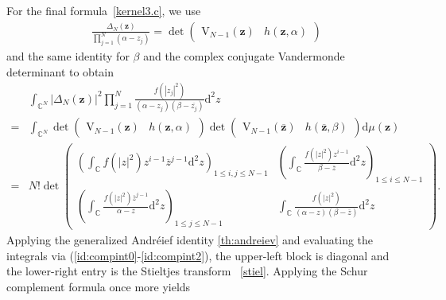 \documentclass[pdflatex,sn-mathphys-num]{sn-jnl}
\theoremstyle{thmstyleone}
\numberwithin{equation}{section}
\newcommand{\C}{\mathbb{C}}
\begin{document}
\begin{appendices}
For the final formula~\eqref{kernel3.c}, we use
    \begin{align}
        \frac{\Delta_{N}\left(\mathbf{z}\right)}{\prod\limits_{j=1}^{N}\left(\alpha-z_{j}\right)}=\det\begin{pmatrix}
\mathrm{V}_{N-1}\left( \mathbf{z} \right) & h\left( \mathbf{z},\alpha \right)
\end{pmatrix}
    \end{align}
and the same identity for $\beta$ and the complex conjugate Vandermonde determinant to obtain
    \begin{equation}
    \begin{split}
        &\int_{\C^{N}}^{} \left | \Delta_{N}\left ( \mathbf{z} \right ) \right |^{2}\prod\limits_{j=1}^{N}\frac{f\left ( \left | z_{j} \right |^{2} \right )}{\left ( \alpha-z_{j} \right )\left ( \beta-\overline{z_{j}} \right )}\mathrm{d}^{2}z\\
        =&\int_{\C^{N}}^{}\det\begin{pmatrix}
\mathrm{V}_{N-1}\left( \mathbf{z} \right) & h\left( \mathbf{z},\alpha \right)
\end{pmatrix}\det\begin{pmatrix}
\mathrm{V}_{N-1}\left( \overline{\mathbf{z}} \right) & h\left( \overline{\mathbf{z}},\beta \right)
\end{pmatrix}\mathrm{d}\mu\left(\mathbf{z}\right)\\
=&N!\det\left(\begin{array}{c|c}
\left( \int_{\C}^{}f\left( \left| z \right|^{2} \right)z^{i-1}\overline{z}^{j-1}\mathrm{d}^{2}z \right)_{1\leq i,j\leq N-1} &\displaystyle \underset{ }{\left( \int_{\C}^{}\frac{f\left( \left| z \right|^{2} \right)z^{i-1}}{\beta-\overline{z}}\mathrm{d}^{2}z \right)_{1\leq i\leq N-1}} \\\hline \displaystyle
\left( \int_{\C}^{}\frac{f\left( \left| z \right|^{2} \right)\overline{z}^{j-1}}{\alpha-z}\mathrm{d}^{2}z \right)_{1\leq j\leq N-1} &\displaystyle \int_{\C}^{}\frac{f\left( \left| z \right|^{2} \right)}{\left( \alpha-z \right)\left( \beta-\overline{z} \right)}\mathrm{d}^{2}z 
\end{array}\right).
\end{split}
\end{equation}
Applying the generalized Andr\'eief identity \ref{th:andreiev} and evaluating the integrals via (\ref{id:compint0}-\ref{id:compint2}), the upper-left block is diagonal and the lower-right entry is the Stieltjes transform ~\eqref{stiel}. Applying the Schur complement formula once more yields

\end{appendices}
\end{document}
